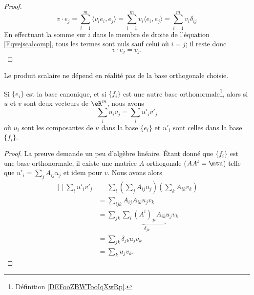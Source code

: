 \begin{proof}
    \begin{equation}    \label{Eqvejscalcomp}
        v\cdot e_j=\sum_{i=1}^m\langle v_ie_i, e_j\rangle =\sum_{i=1}^mv_i\langle e_i, e_j\rangle =\sum_{i=1}^mv_i\delta_{ij}
    \end{equation}
    En effectuant la somme sur \( i\) dans le membre de droite de l'équation \eqref{Eqvejscalcomp}, tous les termes sont nuls sauf celui où \( i=j\); il reste donc
    \begin{equation}
        v\cdot e_j=v_j.
    \end{equation}
\end{proof}

Le produit scalaire ne dépend en réalité pas de la base orthogonale choisie.

\begin{lemma}
    Si \( \{ e_i \}\) est la base canonique, et si \( \{ f_i \}\) est une autre base orthonormale\footnote{Définition \ref{DEFooZBWTooIqXwRp}.}, alors si \( u\) et \( v\) sont deux vecteurs de \( \eR^m\), nous avons
    \begin{equation}
        \sum_i u_iv_j=\sum_iu'_iv'_j
    \end{equation}
    où \( u_i\) sont les composantes de \( u\) dans la base \( \{ e_i \}\) et \( u'_i\) sont celles dans la base \( \{ f_i \}\).
\end{lemma}

\begin{proof}
    La preuve demande un peu d'algèbre linéaire. Étant donné que $\{ f_i \}$ est une base orthonormale, il existe une matrice $A$ orthogonale ($AA^t=\mtu$) telle que $u'_i=\sum_jA_{ij}u_j$ et idem pour $v$. Nous avons alors
    \begin{equation}
      \begin{aligned}[]
        \sum_iu'_iv'_j  & =\sum_i\left( \sum_jA_{ij} u_j\right)\left( \sum_k A_{ik}v_k \right) \\
                        & =\sum_{ijk}A_{ij}A_{ik}u_jv_k                                        \\
                        & =\sum_{jk}\underbrace{\sum_i(A^t)_{ji}A_{ik}}_{=\delta_{jk}}u_jv_k   \\
                        & =\sum_{jk}\delta_{jk}u_jv_k                                          \\
                        & =\sum_ku_jv_k.
      \end{aligned}
    \end{equation}
\end{proof}

